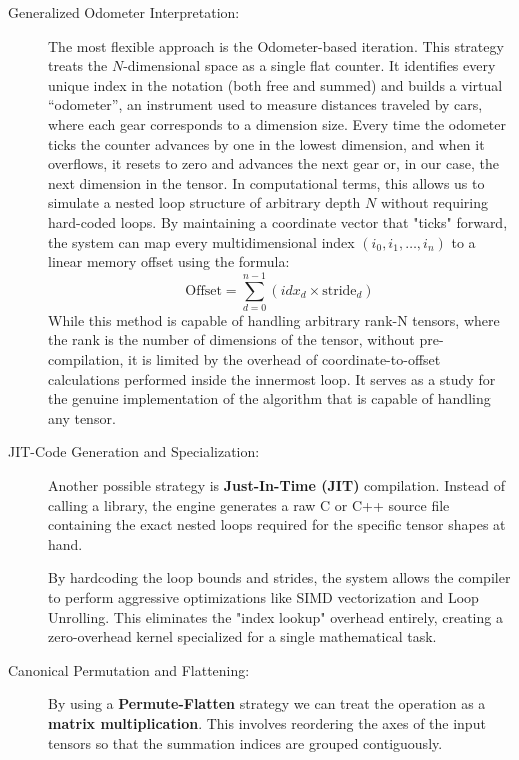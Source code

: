 \documentclass[binding=0.6cm]{sapthesis}
\begin{document}
\begin{description}
	\item [Generalized Odometer Interpretation:]
	      The most flexible approach is the Odometer-based iteration.
	      This strategy treats the $N$-dimensional space as a single flat counter.
	      It identifies every unique index in the notation (both free and summed) and builds a virtual ``odometer'',
	      an instrument used to measure distances traveled by cars, where each gear corresponds to a dimension size. Every time the odometer ticks the counter advances by one in the lowest dimension, and when it overflows, it resets to zero and advances the next gear or, in our case, the next dimension in the tensor.
	      In computational terms, this allows us to simulate a nested loop structure of arbitrary depth $N$ without requiring hard-coded loops. By maintaining a coordinate vector that "ticks" forward, the system can map every multidimensional index $(i_0, i_1, \dots, i_n)$ to a linear memory offset using the formula:
	      \begin{equation}
		      \text{Offset} = \sum_{d=0}^{n-1} \left( idx_d \times \text{stride}_d \right)
	      \end{equation}
	      While this method is capable of handling arbitrary rank-N tensors, where the rank is the number of dimensions of the tensor, without pre-compilation, it is limited by the overhead of coordinate-to-offset calculations performed inside the innermost loop. It serves as a study for the genuine implementation of the algorithm that is capable of handling any tensor.

	\item [JIT-Code Generation and Specialization:]
	      Another possible strategy is \textbf{Just-In-Time (JIT)} compilation. Instead of calling a library, the engine generates a raw C or C++ source file containing the exact nested loops required for the specific tensor shapes at hand.

	      By hardcoding the loop bounds and strides, the system allows the compiler to perform aggressive optimizations like SIMD vectorization and Loop Unrolling. This eliminates the "index lookup" overhead entirely, creating a zero-overhead kernel specialized for a single mathematical task.
	\item [Canonical Permutation and Flattening:]
	      By using a \textbf{Permute-Flatten} strategy we can treat the operation as a \textbf{matrix multiplication}. This involves reordering the axes of the input tensors so that the summation indices are grouped contiguously.


\end{description}
\end{document}
